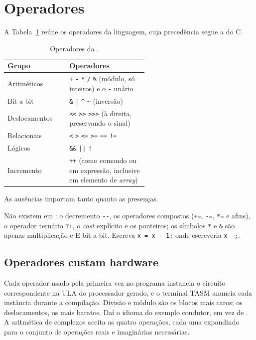 \section{Operadores}

A Tabela~\ref{tab:operadores} reúne os operadores da linguagem, cuja precedência segue a do C.

\begin{table}[ht]
\centering
\caption{Operadores da \cmm{}.}
\label{tab:operadores}
\small
\begin{tabular}{lp{0.56\linewidth}}
\toprule
Grupo & Operadores \\
\midrule
Aritméticos & \texttt{+} \enspace \texttt{-} \enspace \texttt{*} \enspace \texttt{/} \enspace \texttt{\%} (módulo, só inteiros) e o \texttt{-} unário \\
Bit a bit & \texttt{\&} \enspace \texttt{|} \enspace \texttt{\textasciicircum} \enspace \texttt{\textasciitilde} (inversão) \\
Deslocamentos & \texttt{<<} \enspace \texttt{>>} \enspace \texttt{>>>} (à direita, preservando o sinal) \\
Relacionais & \texttt{<} \enspace \texttt{>} \enspace \texttt{<=} \enspace \texttt{>=} \enspace \texttt{==} \enspace \texttt{!=} \\
Lógicos & \texttt{\&\&} \enspace \texttt{||} \enspace \texttt{!} \\
Incremento & \texttt{++} (como comando ou em expressão, inclusive em elemento de \textit{array}) \\
\bottomrule
\end{tabular}
\end{table}

As ausências importam tanto quanto as presenças.

\begin{aviso}
Não existem em \cmm{}: o decremento \texttt{-{}-}, os operadores compostos (\texttt{+=}, \texttt{-=}, \texttt{*=} e afins), o operador ternário \texttt{?:}, o \textit{cast} explícito e os ponteiros; os símbolos \texttt{*} e \texttt{\&} são apenas multiplicação e E bit a bit. Escreva \texttt{x = x - 1;} onde escreveria \texttt{x-{}-;}.
\end{aviso}

\subsection{Operadores custam hardware}

Cada operador usado pela primeira vez no programa instancia o circuito correspondente na ULA do processador gerado, e o terminal TASM anuncia cada instância durante a compilação. Divisão e módulo são os blocos mais caros; os deslocamentos, os mais baratos. Daí o idioma do exemplo condutor,  em vez de . A aritmética de complexos aceita as quatro operações, cada uma expandindo para o conjunto de operações reais e imaginárias necessárias.

